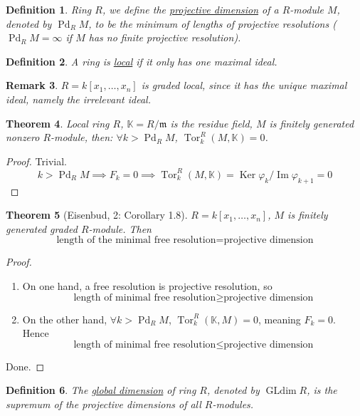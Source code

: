 \documentclass[11pt]{article}
\DeclareMathOperator{\Ker}{Ker}
\DeclareMathOperator{\ImOp}{Im} %
\DeclareMathOperator{\Tor}{Tor}
\DeclareMathOperator{\Pd}{Pd}
\DeclareMathOperator{\GLdim}{GLdim}
\newtheorem{theorem}{Theorem}[section]
\newtheorem{definition}[theorem]{Definition}
\newtheorem{remark}[theorem]{Remark}
\begin{document}
\begin{definition}
    Ring $R$, we define the \underline{projective dimension} of a $R$-module $M$, denoted by $\Pd_R M$, to be the minimum of lengths of projective resolutions ($\Pd_R M = \infty$ if $M$ has no finite projective resolution).
\end{definition}

\begin{definition}
    A ring is \underline{local} if it only has one maximal ideal.
\end{definition}

\begin{remark}
    $R = k[x_1, \dots, x_n]$ is graded local, since it has the unique maximal ideal, namely the irrelevant ideal.
\end{remark}

\begin{theorem}
    Local ring $R$, $\mathbb{K} = R/\mathfrak{m}$ is the residue field, $M$ is finitely generated nonzero $R$-module, then: $\forall k > \Pd_R M$, $\Tor_k^R(M, \mathbb{K}) = 0$.
\end{theorem}
\begin{proof}
    Trivial.
    $$ k > \Pd_R M \implies F_k = 0 \implies \Tor_k^R(M, \mathbb{K}) = \Ker \varphi_k / \ImOp \varphi_{k+1} = 0 $$
\end{proof}

\begin{theorem}[Eisenbud, 2: Corollary 1.8]
    $R = k[x_1, \dots, x_n]$, $M$ is finitely generated graded $R$-module. Then
    $$ \text{length of the minimal free resolution} = \text{projective dimension} $$
\end{theorem}
\begin{proof}
    \begin{enumerate}
        \item[i)] On one hand, a free resolution is projective resolution, so
        $$ \text{length of minimal free resolution} \ge \text{projective dimension} $$
        \item[ii)] On the other hand, $\forall k > \Pd_R M$, $\Tor_k^R(\mathbb{K}, M) = 0$, meaning $F_k = 0$. Hence
        $$ \text{length of minimal free resolution} \le \text{projective dimension} $$
    \end{enumerate}
    Done.
\end{proof}

\begin{definition}
    The \underline{global dimension} of ring $R$, denoted by $\GLdim R$, is the supremum of the projective dimensions of all $R$-modules.
\end{definition}
\end{document}
